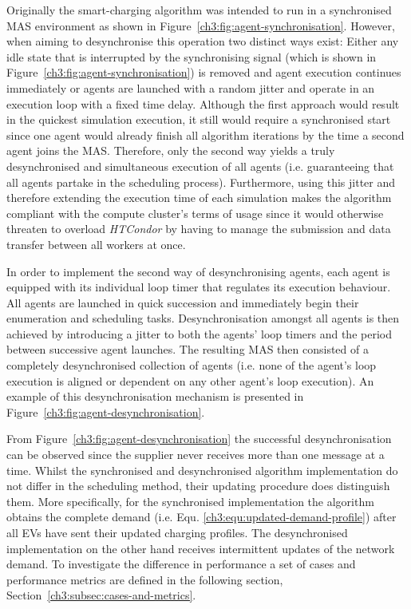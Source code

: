 Originally the smart-charging algorithm was intended to run in a synchronised MAS environment as shown in Figure~\ref{ch3:fig:agent-synchronisation}.
However, when aiming to desynchronise this operation two distinct ways exist:
Either any idle state that is interrupted by the synchronising signal (which is shown in Figure~\ref{ch3:fig:agent-synchronisation}) is removed and agent execution continues immediately or agents are launched with a random jitter and operate in an execution loop with a fixed time delay.
Although the first approach would result in the quickest simulation execution, it still would require a synchronised start since one agent would already finish all algorithm iterations by the time a second agent joins the MAS.
Therefore, only the second way yields a truly desynchronised and simultaneous execution of all agents (i.e. guaranteeing that all agents partake in the scheduling process).
Furthermore, using this jitter and therefore extending the execution time of each simulation makes the algorithm compliant with the compute cluster's terms of usage since it would otherwise threaten to overload \textit{HTCondor} by having to manage the submission and data transfer between all workers at once.

In order to implement the second way of desynchronising agents, each agent is equipped with its individual loop timer that regulates its execution behaviour.
All agents are launched in quick succession and immediately begin their enumeration and scheduling tasks.
Desynchronisation amongst all agents is then achieved by introducing a jitter to both the agents' loop timers and the period between successive agent launches.
The resulting MAS then consisted of a completely desynchronised collection of agents (i.e. none of the agent's loop execution is aligned or dependent on any other agent's loop execution).
An example of this desynchronisation mechanism is presented in Figure~\ref{ch3:fig:agent-desynchronisation}.



From Figure~\ref{ch3:fig:agent-desynchronisation} the successful desynchronisation can be observed since the supplier never receives more than one message at a time.
Whilst the synchronised and desynchronised algorithm implementation do not differ in the scheduling method, their updating procedure does distinguish them.
More specifically, for the synchronised implementation the algorithm obtains the complete demand (i.e. Equ. \ref{ch3:equ:updated-demand-profile}) after all EVs have sent their updated charging profiles.
The desynchronised implementation on the other hand receives intermittent updates of the network demand.
To investigate the difference in performance a set of cases and performance metrics are defined in the following section, Section~\ref{ch3:subsec:cases-and-metrics}.

